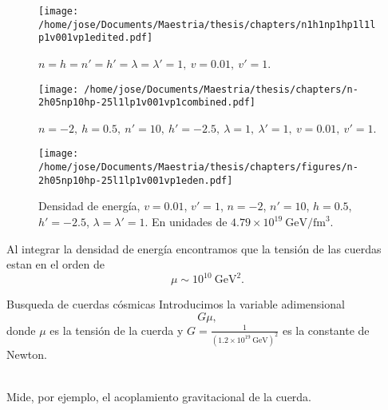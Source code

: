\documentclass[14pt]{beamer}
\begin{document}
\begin{frame}
\begin{figure}
	\centering
	\texttt{[image: /home/jose/Documents/Maestria/thesis/chapters/n1h1np1hp1l1lp1v001vp1edited.pdf]}
		\caption{$n = h = n' = h'  = \lambda=\lambda' = 1,\ v =0.01,\ v' = 1 $.}
		\label{fig:sol1}
\end{figure}
\end{frame}

\begin{frame}
\begin{figure}
	\centering
	\texttt{[image: /home/jose/Documents/Maestria/thesis/chapters/n-2h05np10hp-25l1lp1v001vp1combined.pdf]}
		\caption{$n = -2,\ h =0.5,\ n' = 10,\ h' = -2.5,\  \lambda=1,\ \lambda' = 1,\ v =0.01,\ v' = 1 $.}
		\label{fig:coaxial}
\end{figure}
\end{frame}


\begin{frame}
\begin{figure}
	\centering
	\texttt{[image: /home/jose/Documents/Maestria/thesis/chapters/figures/n-2h05np10hp-25l1lp1v001vp1eden.pdf]}
	\caption{Densidad de energía, $v = 0.01$, $v'=1$, $n=-2$, $n'=10$, $h=0.5$, $h'=-2.5$, $\lambda=\lambda'=1$. En unidades de $4.79\times 10^{19}\ \text{GeV}/\text{fm}^3$.}
	\label{fig:edencoaxial}
\end{figure}
\end{frame}

\begin{frame}
Al integrar la densidad de energía encontramos que la tensión de las cuerdas estan en el orden de
\begin{equation*}
	\mu \sim 10^{10}\ \text{GeV}^2.
\end{equation*}


\end{frame}



\begin{frame}{Busqueda de cuerdas cósmicas}
Introducimos la variable adimensional
\begin{equation*}
	G\mu ,
\end{equation*}
donde $\mu$ es la tensión de la cuerda y $G = \frac{1}{(1.2\times 10^{19}\ \text{GeV})^2}$ es la constante de Newton.\\~\

Mide, por ejemplo, el acoplamiento gravitacional de la cuerda.
\end{frame}
\end{document}
